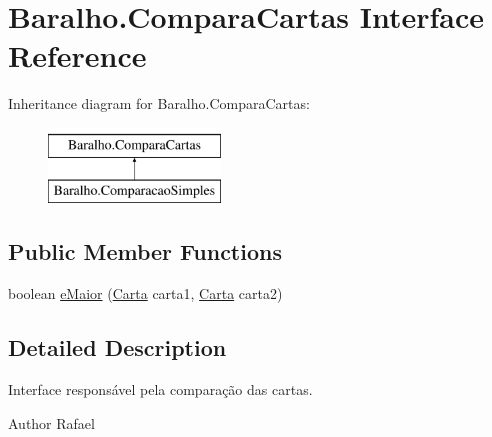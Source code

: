 \hypertarget{interface_baralho_1_1_compara_cartas}{
\section{Baralho.ComparaCartas Interface Reference}
\label{interface_baralho_1_1_compara_cartas}
}
Inheritance diagram for Baralho.ComparaCartas:\begin{figure}[H]
\begin{center}
\leavevmode
\includegraphics[height=2.000000cm]{interface_baralho_1_1_compara_cartas}
\end{center}
\end{figure}
\subsection*{Public Member Functions}
\begin{DoxyCompactItemize}
\item 
boolean \hyperlink{interface_baralho_1_1_compara_cartas_a805a502954c21d6fac410506bf81c955}{eMaior} (\hyperlink{class_baralho_1_1_carta}{Carta} carta1, \hyperlink{class_baralho_1_1_carta}{Carta} carta2)
\end{DoxyCompactItemize}


\subsection{Detailed Description}
Interface responsável pela comparação das cartas. \begin{DoxyAuthor}{Author}
Rafael 
\end{DoxyAuthor}


